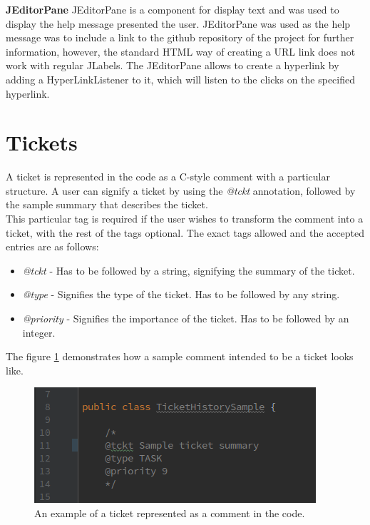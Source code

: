 \documentclass{4thYearProject}
\begin{document}
\newline
\textbf{JEditorPane}
\newline
JEditorPane is a component for display text and was used to display the help message presented the user. JEditorPane was used as the help message was to include a link to the github repository of the project for further information, however, the standard HTML way of creating a URL link does not work with regular JLabels. The JEditorPane allows to create a hyperlink by adding a HyperLinkListener to it, which will listen to the clicks on the specified hyperlink. 
\section{Tickets}

A ticket is represented in the code as a C-style comment with a particular structure. A user can signify a ticket by using the \textit{@tckt} annotation, followed by the sample summary that describes the ticket. \\
This particular tag is required if the user wishes to transform the comment into a ticket, with the rest of the tags optional. The exact tags allowed and the accepted entries are as follows:

\begin{itemize}
\item \textit{@tckt} - Has to be followed by a string, signifying the summary of the ticket.  
\item \textit{@type} - Signifies the type of the ticket. Has to be followed by any string.
\item \textit{@priority} - Signifies the importance of the ticket. Has to be followed by an integer.
\end{itemize}

The figure \ref{fig:ticketcomment} demonstrates  how a sample comment intended to be a ticket looks like.

\begin{figure}[H]
\includegraphics[scale=0.6]{Ticket_comment}
\centering
\caption{An example of a ticket represented as a comment in the code.}\label{ticketcomment}
\label{fig:ticketcomment}
\end{figure}
\end{document}
